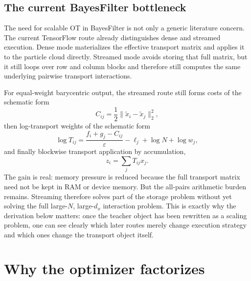 \subsection{The current BayesFilter bottleneck}
\label{sec:bf-eot-current-bottleneck}

The need for scalable OT in BayesFilter is not only a generic literature concern.
The current TensorFlow route already distinguishes dense and streamed execution.
Dense mode materializes the effective transport matrix and applies it to the
particle cloud directly.  Streamed mode avoids storing that full matrix, but it
still loops over row and column blocks and therefore still computes the same
underlying pairwise transport interactions.

For equal-weight barycentric output, the streamed route still forms costs of the
schematic form
\begin{equation}
\label{eq:bf-eot-current-cost}
  C_{ij}
  =
  \frac{1}{2}\|\tilde x_i-\tilde x_j\|_2^2,
\end{equation}
then log-transport weights of the schematic form
\begin{equation}
\label{eq:bf-eot-current-log-transport}
  \log T_{ij}
  =
  \frac{f_i+g_j-C_{ij}}{\varepsilon}
  - \ell_j
  + \log N
  + \log w_j,
\end{equation}
and finally blockwise transport application by accumulation,
\begin{equation}
\label{eq:bf-eot-current-streamed-application}
  z_i = \sum_j T_{ij}x_j.
\end{equation}
The gain is real: memory pressure is reduced because the full transport matrix need
not be kept in RAM or device memory.  But the all-pairs arithmetic burden remains.
Streaming therefore solves part of the storage problem without yet solving the full
large-\(N\), large-\(d_x\) interaction problem.  This is exactly why the derivation
below matters: once the teacher object has been rewritten as a scaling problem, one
can see clearly which later routes merely change execution strategy and which ones
change the transport object itself.

\section{Why the optimizer factorizes}
\label{sec:bf-eot-factorization}

